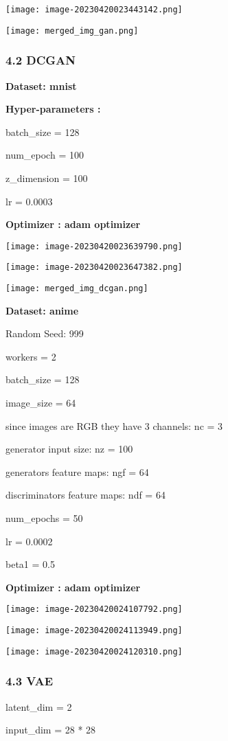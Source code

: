 \documentclass[
]{article}
\begin{document}
\texttt{[image: image-20230420023443142.png]}

\texttt{[image: merged\_img\_gan.png]}

\hypertarget{42-dcgan}{%
\subsubsection{4.2 DCGAN}\label{42-dcgan}}

\textbf{Dataset: mnist}

\textbf{Hyper-parameters :}

batch\_size = 128

num\_epoch = 100

z\_dimension = 100

lr = 0.0003

\textbf{Optimizer : adam optimizer}

\texttt{[image: image-20230420023639790.png]}

\texttt{[image: image-20230420023647382.png]}

\texttt{[image: merged\_img\_dcgan.png]}

\textbf{Dataset: anime}

Random Seed: 999

workers = 2

batch\_size = 128

image\_size = 64

since images are RGB they have 3 channels: nc = 3

generator input size: nz = 100

generator\textquotesingle s feature maps: ngf = 64

discriminator\textquotesingle s feature maps: ndf = 64

num\_epochs = 50

lr = 0.0002

beta1 = 0.5

\textbf{Optimizer : adam optimizer}

\texttt{[image: image-20230420024107792.png]}

\texttt{[image: image-20230420024113949.png]}

\texttt{[image: image-20230420024120310.png]}

\hypertarget{43-vae}{%
\subsubsection{4.3 VAE}\label{43-vae}}

latent\_dim = 2

input\_dim = 28 * 28
\end{document}
